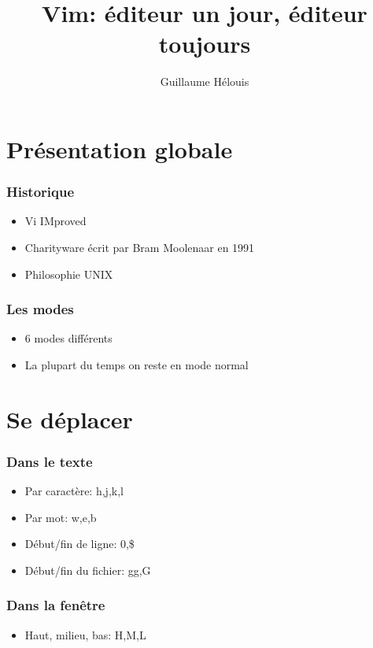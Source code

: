 \documentclass{beamer}
\title{Vim: éditeur un jour, éditeur toujours}
\author{Guillaume Hélouis}
\begin{document}
\begin{frame}
  \titlepage
\end{frame}

\section{Présentation globale}
\begin{frame} \frametitle{Historique}
  \begin{itemize}
    \item Vi IMproved
    \item Charityware écrit par Bram Moolenaar en 1991
    \item Philosophie UNIX
  \end{itemize}
\end{frame}
\begin{frame} \frametitle{Les modes}
  \begin{itemize}
    \item 6 modes différents
    \item La plupart du temps on reste en mode normal
  \end{itemize}
\end{frame}

\section{Se déplacer}
\begin{frame} \frametitle{Dans le texte}
  \begin{itemize}
    \item Par caractère: h,j,k,l
    \item Par mot: w,e,b
    \item Début/fin de ligne: 0,\$
    \item Début/fin du fichier: gg,G
  \end{itemize}
\end{frame}
\begin{frame} \frametitle{Dans la fenêtre}
  \begin{itemize}
    \item Haut, milieu, bas: H,M,L
  \end{itemize}
\end{frame}
\end{document}
